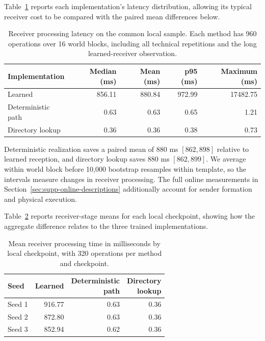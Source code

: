 \documentclass[sigconf,nonacm,balance=false]{aamas}
\newcommand{\tabstyle}{\small\setlength{\tabcolsep}{3pt}\renewcommand{\arraystretch}{1.10}}
\begin{document}
Table~\ref{tab:receiver-timing} reports each implementation's latency distribution, allowing its typical receiver cost to be compared with the paired mean differences below.

\begin{table}[!htbp]
\centering\tabstyle
\caption{Receiver processing latency on the common local sample. Each method has 960 operations over 16 world blocks, including all technical repetitions and the long learned-receiver observation.}
\label{tab:receiver-timing}
\begin{tabular}{@{}lrrrr@{}}
\toprule
Implementation & Median (ms) & Mean (ms) & p95 (ms) & Maximum (ms)\\
\midrule
Learned & 856.11 & 880.84 & 972.99 & 17482.75\\
Deterministic path & 0.63 & 0.63 & 0.65 & 1.21\\
Directory lookup & 0.36 & 0.36 & 0.38 & 0.73\\
\bottomrule\end{tabular}\end{table}

Deterministic realization saves a paired mean of 880 ms $[862,898]$ relative to learned reception, and directory lookup saves 880 ms $[862,899]$. We average within world block before 10,000 bootstrap resamples within template, so the intervals measure changes in receiver processing. The full online measurements in Section~\ref{sec:supp-online-descriptions} additionally account for sender formation and physical execution.

Table~\ref{tab:receiver-seeds} reports receiver-stage means for each local checkpoint, showing how the aggregate difference relates to the three trained implementations.

\begin{table}[!htbp]
\centering\tabstyle
\caption{Mean receiver processing time in milliseconds by local checkpoint, with 320 operations per method and checkpoint.}
\label{tab:receiver-seeds}
\begin{tabular}{@{}lrrr@{}}
\toprule
Seed & Learned & \shortstack{Deterministic\\path} & \shortstack{Directory\\lookup}\\\midrule
Seed 1 & 916.77 & 0.63 & 0.36\\
Seed 2 & 872.80 & 0.63 & 0.36\\
Seed 3 & 852.94 & 0.62 & 0.36\\
\bottomrule\end{tabular}\end{table}
\end{document}
